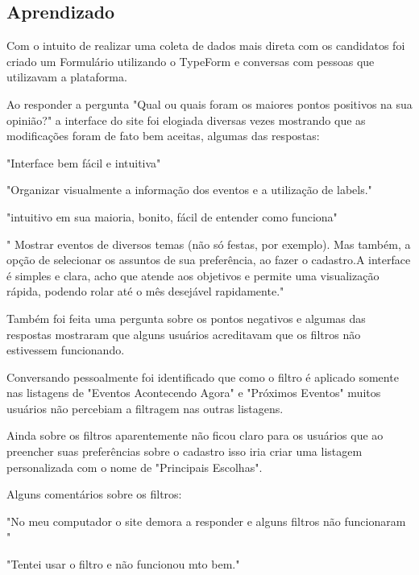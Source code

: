 \subsection{Aprendizado}
\par Com o intuito de realizar uma coleta de dados mais direta com os candidatos foi criado um Formulário utilizando o TypeForm e conversas com pessoas que utilizavam a plataforma.
\par Ao responder a pergunta "Qual ou quais foram os maiores pontos positivos na sua opinião?" a interface do site foi elogiada diversas vezes mostrando que as modificações foram de fato bem aceitas, algumas das respostas:
\par "Interface bem fácil e intuitiva"
\par "Organizar visualmente a informação dos eventos e a utilização de labels."
\par "intuitivo em sua maioria, bonito, fácil de entender como funciona"
\par " Mostrar eventos de diversos temas (não só festas, por exemplo). Mas também, a 
opção de selecionar os  assuntos de sua preferência, ao fazer o cadastro.A interface é simples e clara, acho que atende aos objetivos e permite uma visualização rápida, podendo rolar até o mês desejável rapidamente."

\par Também foi feita uma pergunta sobre os pontos negativos e algumas das respostas mostraram que alguns usuários acreditavam que os filtros não estivessem funcionando.
\par Conversando pessoalmente foi identificado que como o filtro é aplicado somente nas listagens de "Eventos Acontecendo Agora" e "Próximos Eventos" muitos usuários não percebiam a filtragem nas outras listagens.
\par Ainda sobre os filtros aparentemente não ficou claro para os usuários que ao preencher suas preferências sobre o cadastro isso iria criar uma listagem personalizada com o nome de "Principais Escolhas".
\par Alguns comentários sobre os filtros:
\par "No meu computador o site demora a responder e alguns filtros não funcionaram "
\par "Tentei usar o filtro e não funcionou mto bem."


